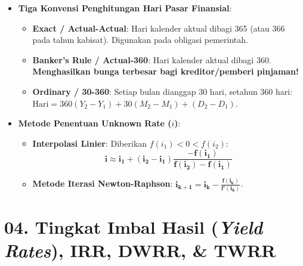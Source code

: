 \documentclass[10pt,a4paper]{article}
\begin{document}
\begin{jebakanbox}
\begin{itemize}[leftmargin=1.5em, topsep=1.5pt, itemsep=2pt]
    \item \textbf{Tiga Konvensi Penghitungan Hari Pasar Finansial}:
    \begin{itemize}[leftmargin=1.2em, topsep=1pt, itemsep=1.5pt]
        \item \textbf{Exact / Actual-Actual}: Hari kalender aktual dibagi 365 (atau 366 pada tahun kabisat). Digunakan pada obligasi pemerintah.
        \item \textbf{Banker's Rule / Actual-360}: Hari kalender aktual dibagi 360. \textbf{Menghasilkan bunga terbesar bagi kreditor/pemberi pinjaman!}
        \item \textbf{Ordinary / 30-360}: Setiap bulan dianggap 30 hari, setahun 360 hari: $\text{Hari} = 360(Y_2-Y_1) + 30(M_2-M_1) + (D_2-D_1)$.
    \end{itemize}
    \item \textbf{Metode Penentuan Unknown Rate ($i$)}:
    \begin{itemize}[leftmargin=1.2em, topsep=1pt, itemsep=1.5pt]
        \item \textbf{Interpolasi Linier}: Diberikan $f(i_1) < 0 < f(i_2)$:
        \begin{equation*}
            \mathbf{i \approx i_1 + (i_2 - i_1) \frac{-f(i_1)}{f(i_2) - f(i_1)}}
        \end{equation*}
        \item \textbf{Metode Iterasi Newton-Raphson}: $\mathbf{i_{k+1} = i_k - \frac{f(i_k)}{f'(i_k)}}$.
    \end{itemize}
\end{itemize}
\end{jebakanbox}

\section*{\large 04. Tingkat Imbal Hasil (\textit{Yield Rates}), IRR, DWRR, \& TWRR}
\end{document}
